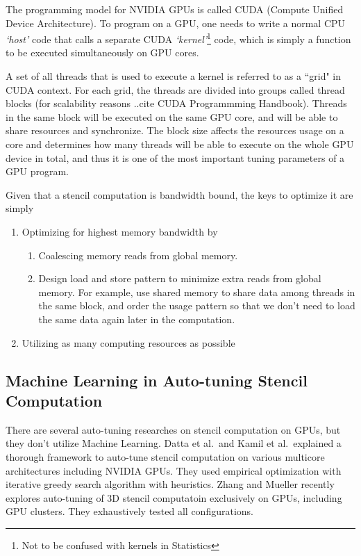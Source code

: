 The programming model for NVIDIA GPUs is called CUDA (Compute Unified Device Architecture). To program on a GPU, one needs to write a normal CPU \emph{`host'} code that calls a separate CUDA \emph{`kernel'}\footnote{Not to be confused with kernels in Statistics} code, which is simply a function to be executed simultaneously on GPU cores.

A set of all threads that is used to execute a kernel is referred to as a ``grid" in CUDA context. For each grid, the threads are divided into groups called thread blocks (for scalability reasons ..cite CUDA Programmming Handbook). Threads in the same block will be executed on the same GPU core, and will be able to share resources and synchronize. The block size affects the resources usage on a core and determines how many threads will be able to execute on the whole GPU device in total, and thus it is one of the most important tuning parameters of a GPU program.

Given that a stencil computation is bandwidth bound, the keys to optimize it are simply
\begin{enumerate}
	\item Optimizing for highest memory bandwidth by
		\begin{enumerate}
			\item Coalescing memory reads from global memory.
			\item Design load and store pattern to minimize extra reads from global memory. For example, use shared memory to share data among threads in the same block, and order the usage pattern so that we don't need to load the same data again later in the computation.
		\end{enumerate}
	\item Utilizing as many computing resources as possible
\end{enumerate}

\subsection{Machine Learning in Auto-tuning Stencil Computation}
There are several auto-tuning researches on stencil computation on GPUs, but they don't utilize Machine Learning. Datta et al.\ and Kamil et al.\ explained a thorough framework to auto-tune stencil computation on various multicore architectures including NVIDIA GPUs. They used empirical optimization with iterative greedy search algorithm with heuristics. \cite{datta08, datta09, shoaib10} Zhang and Mueller recently explores auto-tuning of 3D stencil computatoin exclusively on GPUs, including GPU clusters. They exhaustively tested all configurations. \cite{zhang12}

